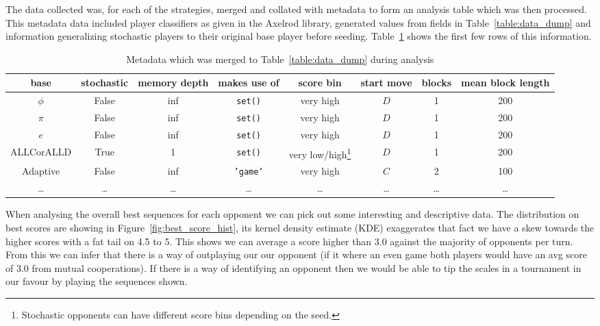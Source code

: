 The data collected was, for each of the strategies, merged and collated with metadata to form an analysis table which was then processed.
This metadata data included player classifiers as given in the Axelrod library, generated values from fields in Table~\ref{table:data_dump} and information generalizing stochastic players to their original base player before seeding.
Table~\ref{table:meta_data} shows the first few rows of this information.

\begin{table}[ht]
    \centering
    \begin{tabular}{cccccccc}
        \toprule
        base & stochastic & memory depth & makes use of & score bin & start move & blocks & mean block length\\
        \midrule
        $\phi$ & False & inf & \texttt{set()} & very high &  $D$ & 1 & 200\\

        $\pi$ & False & inf & \texttt{set()} & very high &  $D$ & 1 & 200\\

        $e$ & False & inf & \texttt{set()} & very high &  $D$ & 1 & 200\\

        ALLCorALLD & True & 1 & \texttt{set()} & very low/high\footnote{Stochastic opponents can have different score bins depending on the seed.} &  $D$ & 1 & 200\\

        Adaptive & False & inf & \texttt{'game'} & very high &  $C$ & 2 & 100\\

        \ldots & \ldots & \ldots & \ldots & \ldots & \ldots & \ldots & \ldots\\    
        \bottomrule
    \end{tabular}
    \caption{Metadata which was merged to Table~\ref{table:data_dump} during analysis}\label{table:meta_data}
\end{table}

When analysing the overall best sequences for each opponent we can pick out some interesting and descriptive data.
The distribution on best scores are showing in Figure~\ref{fig:best_score_hist}, its kernel density estimate (KDE) \cite{tukey1977exploratory} exaggerates that fact we have a skew towards the higher scores with a fat tail on 4.5 to 5.
This shows we can average a score higher than 3.0 against the majority of opponents per turn.
From this we can infer that there is a way of outplaying our our opponent (if it where an even game both players would have an avg score of $3.0$ from mutual cooperations).
If there is a way of identifying an opponent then we would be able to tip the scales in a tournament in our favour by playing the sequences shown.

